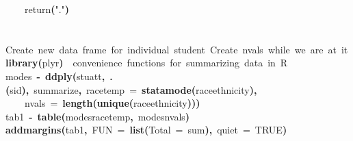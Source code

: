 \documentclass[12pt]{article}
\makeatletter
\newcommand{\hlnumber}[1]{\textcolor[rgb]{0,0,0}{#1}}%
\newcommand{\hlfunctioncall}[1]{\textcolor[rgb]{0.501960784313725,0,0.329411764705882}{\textbf{#1}}}%
\newcommand{\hlstring}[1]{\textcolor[rgb]{0.6,0.6,1}{#1}}%
\newcommand{\hlkeyword}[1]{\textcolor[rgb]{0,0,0}{\textbf{#1}}}%
\newcommand{\hlargument}[1]{\textcolor[rgb]{0.690196078431373,0.250980392156863,0.0196078431372549}{#1}}%
\newcommand{\hlcomment}[1]{\textcolor[rgb]{0.180392156862745,0.6,0.341176470588235}{#1}}%
\newcommand{\hlassignement}[1]{\textcolor[rgb]{0,0,0}{\textbf{#1}}}%
\newcommand{\hlsymbol}[1]{\textcolor[rgb]{0,0,0}{#1}}%
\newcommand{\hlstd}[1]{\textcolor[rgb]{0,0,0}{#1}}%
\newenvironment{kframe}{%
 \def\FrameCommand##1{\hskip\@totalleftmargin \hskip-\fboxsep
 \colorbox{shadecolor}{##1}\hskip-\fboxsep
     \hskip-\linewidth \hskip-\@totalleftmargin \hskip\columnwidth}%
 \MakeFramed {\advance\hsize-\width
   \@totalleftmargin\z@ \linewidth\hsize
   \@setminipage}}%
 {\par\unskip\endMakeFramed}
\newenvironment{knitrout}{}{} %
\makeatother
\begin{document}
\begin{knitrout}
\begin{kframe}
\begin{flushleft}
\hlstd{}{\ }{\ }{\ }{\ }\hlsymbol{return}\hlfunctioncall{}\hlkeyword{(}\hlstring{"{}."{}}\hlkeyword{)}\hspace*{\fill}\\
\hlstd{}\hlkeyword{\usebox{\hlnormalsizeboxclosebrace}}\hspace*{\fill}\\
\hlstd{}\hspace*{\fill}\\
\hlstd{}\hlcomment{\usebox{\hlnormalsizeboxhash}{\ }Create{\ }new{\ }data{\ }frame{\ }for{\ }individual{\ }student{\ }Create{\ }nvals{\ }while{\ }we{\ }are{\ }at{\ }it}\hspace*{\fill}\\
\hlstd{}\hlfunctioncall{library}\hlkeyword{(}\hlsymbol{plyr}\hlkeyword{)}{\ }{\ }\hlcomment{\usebox{\hlnormalsizeboxhash}{\ }convenience{\ }functions{\ }for{\ }summarizing{\ }data{\ }in{\ }R}\hspace*{\fill}\\
\hlstd{}\hlsymbol{modes}{\ }\hlassignement{\usebox{\hlnormalsizeboxlessthan}-}{\ }\hlfunctioncall{ddply}\hlkeyword{(}\hlsymbol{stuatt}\hlkeyword{,}{\ }\hlfunctioncall{.}\hlkeyword{(}\hlsymbol{sid}\hlkeyword{)}\hlkeyword{,}{\ }\hlsymbol{summarize}\hlkeyword{,}{\ }\hlargument{race\usebox{\hlnormalsizeboxunderscore}temp}{\ }\hlargument{=}{\ }\hlfunctioncall{statamode}\hlkeyword{(}\hlsymbol{race\usebox{\hlnormalsizeboxunderscore}ethnicity}\hlkeyword{)}\hlkeyword{,}\hspace*{\fill}\\
\hlstd{}{\ }{\ }{\ }{\ }\hlargument{nvals}{\ }\hlargument{=}{\ }\hlfunctioncall{length}\hlkeyword{(}\hlfunctioncall{unique}\hlkeyword{(}\hlsymbol{race\usebox{\hlnormalsizeboxunderscore}ethnicity}\hlkeyword{)}\hlkeyword{)}\hlkeyword{)}\hspace*{\fill}\\
\hlstd{}\hlsymbol{tab1}{\ }\hlassignement{\usebox{\hlnormalsizeboxlessthan}-}{\ }\hlfunctioncall{table}\hlkeyword{(}\hlsymbol{modes}\hlkeyword{\usebox{\hlnormalsizeboxdollar}}\hlsymbol{race\usebox{\hlnormalsizeboxunderscore}temp}\hlkeyword{,}{\ }\hlsymbol{modes}\hlkeyword{\usebox{\hlnormalsizeboxdollar}}\hlsymbol{nvals}\hlkeyword{)}\hspace*{\fill}\\
\hlstd{}\hlfunctioncall{addmargins}\hlkeyword{(}\hlsymbol{tab1}\hlkeyword{,}{\ }\hlargument{FUN}{\ }\hlargument{=}{\ }\hlfunctioncall{list}\hlkeyword{(}\hlargument{Total}{\ }\hlargument{=}{\ }\hlsymbol{sum}\hlkeyword{)}\hlkeyword{,}{\ }\hlargument{quiet}{\ }\hlargument{=}{\ }\hlnumber{TRUE}\hlkeyword{)}\mbox{}
\normalfont
\end{flushleft}
\begin{verbatim}
                 

\end{verbatim}
\end{kframe}
\end{knitrout}
\end{document}
